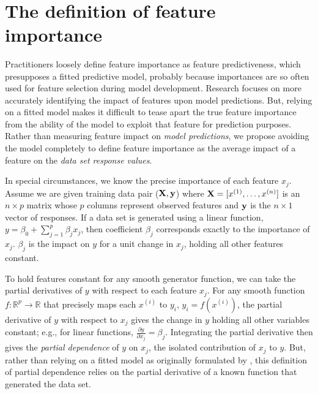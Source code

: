 \documentclass[twoside,11pt]{article}
\newcommand{\todo}[1]{{{\color{red}{[#1]}}}}
\renewcommand{\xi}{x^{(i)}}
\begin{document}
~\\
\noindent \todo{Likely a good spot for a paper walk-through}

\section{The definition of feature importance}\label{sec:def}

Practitioners loosely define feature importance as feature predictiveness, which presupposes a fitted predictive model, probably because importances are so often used for feature selection during model development.  Research  focuses on more accurately identifying the impact of features upon model predictions.  But, relying on a fitted model makes it difficult to tease apart the true feature importance from the ability of the model to exploit that feature for prediction purposes. Rather than measuring feature impact on {\em model predictions}, we propose avoiding the model completely to define feature importance as the average impact of a feature on the {\em data set response values}.

In special circumstances, we know the precise importance of each feature $x_j$. Assume we are given training data pair ($\bf X, y$) where ${\bf X} = [x^{(1)}, \ldots, x^{(n)}]$ is an $n \times p$ matrix whose $p$ columns represent observed features and ${\bf y}$ is the $n \times 1$ vector of responses.  If a data set is generated using a linear function, $y = \beta_0 + \sum_{j=1}^p \beta_j x_j$, \todo{assumes independence of $x_j$?} then coefficient $\beta_j$ corresponds exactly to the importance of $x_j$.  $\beta_j$ is the impact on $y$ for a unit change in $x_j$, holding all other features constant.

To hold features constant for any smooth generator function, we can take the partial derivatives of $y$ with respect to each feature $x_j$. For any smooth function $f:\mathbb{R}^{p} \rightarrow \mathbb{R}$ that precisely maps each $\xi$ to $y_i$, ${y_i} = f(\xi)$, \todo{should that be $y^{(i)}$ to be consistent?} the partial derivative of $y$ with respect to $x_j$ gives the change in $y$ holding all other variables constant; e.g., for linear functions, $\frac{\partial y}{\partial x_j}=\beta_j$. Integrating the partial derivative then gives the {\em partial dependence}  of $y$ on $x_j$, the isolated contribution of $x_j$ to $y$. But, rather than relying on a fitted model as originally formulated by \cite{PDP}, this definition of partial dependence relies on the partial derivative of a known function that generated the data set.
\end{document}
